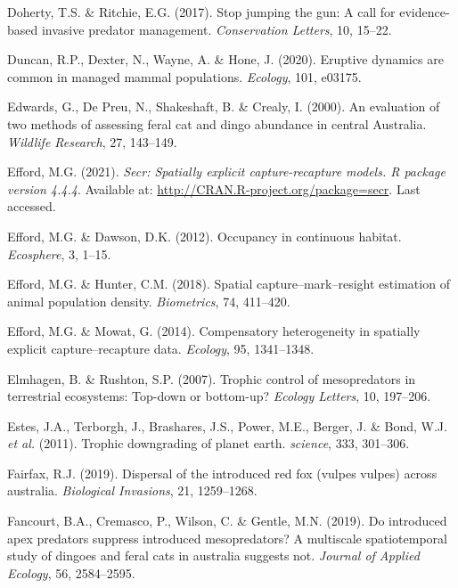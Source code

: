\documentclass[11pt,a4paper,titlepage,twoside,openright]{style/unimelbthesis}
\begin{document}
\begin{mainmatter}
\leavevmode\hypertarget{ref-doherty2017stop}{}%
Doherty, T.S. \& Ritchie, E.G. (2017). Stop jumping the gun: A call for evidence-based invasive predator management. \emph{Conservation Letters}, 10, 15--22.

\leavevmode\hypertarget{ref-duncan2020eruptive}{}%
Duncan, R.P., Dexter, N., Wayne, A. \& Hone, J. (2020). Eruptive dynamics are common in managed mammal populations. \emph{Ecology}, 101, e03175.

\leavevmode\hypertarget{ref-edwards2000evaluation}{}%
Edwards, G., De Preu, N., Shakeshaft, B. \& Crealy, I. (2000). An evaluation of two methods of assessing feral cat and dingo abundance in central Australia. \emph{Wildlife Research}, 27, 143--149.

\leavevmode\hypertarget{ref-efford2021secr}{}%
Efford, M.G. (2021). \emph{Secr: Spatially explicit capture-recapture models. R package version 4.4.4}. Available at: \url{http://CRAN.R-project.org/package=secr}. Last accessed.

\leavevmode\hypertarget{ref-efford2012occupancy}{}%
Efford, M.G. \& Dawson, D.K. (2012). Occupancy in continuous habitat. \emph{Ecosphere}, 3, 1--15.

\leavevmode\hypertarget{ref-efford2018spatial}{}%
Efford, M.G. \& Hunter, C.M. (2018). Spatial capture--mark--resight estimation of animal population density. \emph{Biometrics}, 74, 411--420.

\leavevmode\hypertarget{ref-efford2014compensatory}{}%
Efford, M.G. \& Mowat, G. (2014). Compensatory heterogeneity in spatially explicit capture--recapture data. \emph{Ecology}, 95, 1341--1348.

\leavevmode\hypertarget{ref-elmhagen2007trophic}{}%
Elmhagen, B. \& Rushton, S.P. (2007). Trophic control of mesopredators in terrestrial ecosystems: Top-down or bottom-up? \emph{Ecology Letters}, 10, 197--206.

\leavevmode\hypertarget{ref-estes2011trophic}{}%
Estes, J.A., Terborgh, J., Brashares, J.S., Power, M.E., Berger, J. \& Bond, W.J. \emph{et al.} (2011). Trophic downgrading of planet earth. \emph{science}, 333, 301--306.

\leavevmode\hypertarget{ref-fairfax2019dispersal}{}%
Fairfax, R.J. (2019). Dispersal of the introduced red fox (vulpes vulpes) across australia. \emph{Biological Invasions}, 21, 1259--1268.

\leavevmode\hypertarget{ref-fancourt2019introduced}{}%
Fancourt, B.A., Cremasco, P., Wilson, C. \& Gentle, M.N. (2019). Do introduced apex predators suppress introduced mesopredators? A multiscale spatiotemporal study of dingoes and feral cats in australia suggests not. \emph{Journal of Applied Ecology}, 56, 2584--2595.


\end{mainmatter}
\end{document}
